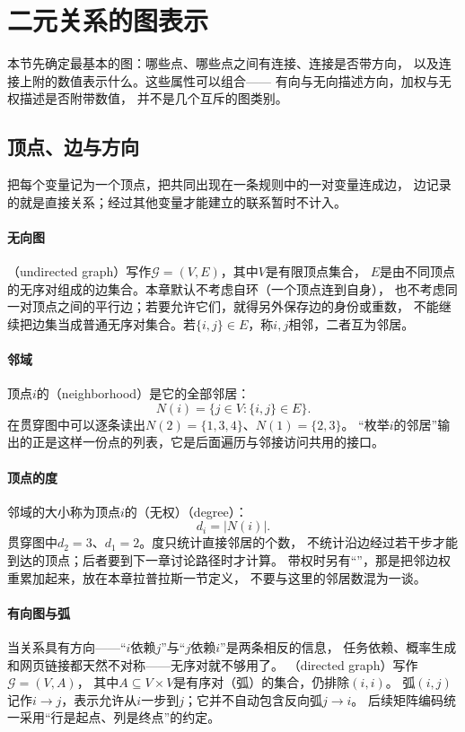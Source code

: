 \section{二元关系的图表示}
\label{sec:graph-theory-binary-relations}

本节先确定最基本的图：哪些点、哪些点之间有连接、连接是否带方向，
以及连接上附的数值表示什么。这些属性可以组合——
有向与无向描述方向，加权与无权描述是否附带数值，
并不是几个互斥的图类别。

\subsection{顶点、边与方向}

把每个变量记为一个顶点，把共同出现在一条规则中的一对变量连成边，
边记录的就是直接关系；经过其他变量才能建立的联系暂时不计入。

\paragraph{无向图}
（undirected graph）写作$\mathcal G=(V,E)$，其中$V$是有限顶点集合，
$E$是由不同顶点的无序对组成的边集合。本章默认不考虑自环（一个顶点连到自身），
也不考虑同一对顶点之间的平行边；若要允许它们，就得另外保存边的身份或重数，
不能继续把边集当成普通无序对集合。若$\{i,j\}\in E$，称$i,j$相邻，二者互为邻居。

\paragraph{邻域}
顶点$i$的（neighborhood）是它的全部邻居：
\[
  N(i)=\{j\in V:\{i,j\}\in E\}.
\]
在贯穿图中可以逐条读出$N(2)=\{1,3,4\}$、$N(1)=\{2,3\}$。
“枚举$i$的邻居”输出的正是这样一份点的列表，它是后面遍历与邻接访问共用的接口。

\paragraph{顶点的度}
邻域的大小称为顶点$i$的（无权）（degree）：
\[
  d_i=|N(i)|.
\]
贯穿图中$d_2=3$、$d_1=2$。度只统计直接邻居的个数，
不统计沿边经过若干步才能到达的顶点；后者要到下一章讨论路径时才计算。
带权时另有“”，那是把邻边权重累加起来，放在本章拉普拉斯一节定义，
不要与这里的邻居数混为一谈。

\paragraph{有向图与弧}
当关系具有方向——“$i$依赖$j$”与“$j$依赖$i$”是两条相反的信息，
任务依赖、概率生成和网页链接都天然不对称——无序对就不够用了。
（directed graph）写作$\mathcal G=(V,A)$，
其中$A\subseteq V\times V$是有序对（弧）的集合，仍排除$(i,i)$。
弧$(i,j)$记作$i\to j$，表示允许从$i$一步到$j$；它并不自动包含反向弧$j\to i$。
后续矩阵编码统一采用“行是起点、列是终点”的约定。


